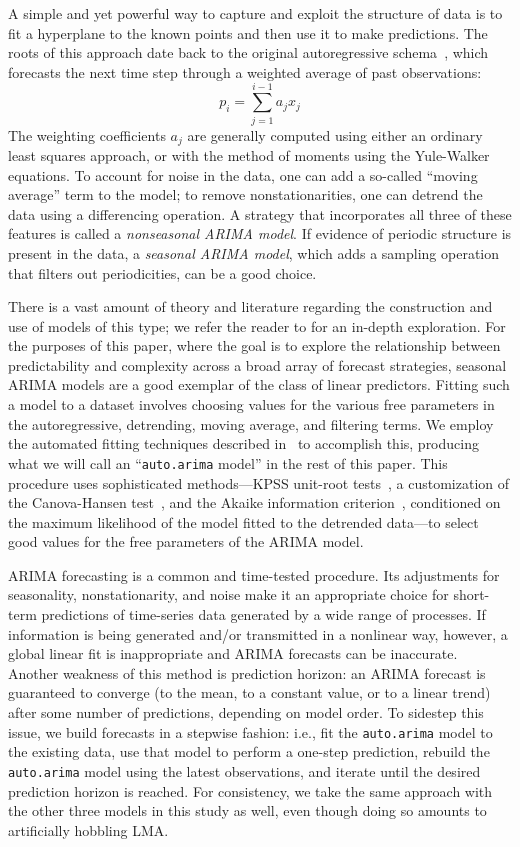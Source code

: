 \documentclass[%
pre,
reprint,
superscriptaddress,
showpacs,
nofootinbib,
nobibnotes,
 amsmath,amssymb,
 aps,
]{revtex4-1}
\newcommand{\arima}{{\tt auto.arima}\xspace}
\begin{document}
A simple and yet powerful way to capture and exploit the structure of
data is to fit a hyperplane to the known points and then use it to
make predictions.  The roots of this approach date back to the
original autoregressive schema~\cite{weigend93}, which forecasts the
next time step through a weighted average of past observations: $$p_i
= \sum_{j=1}^{i-1} a_j x_j$$ The weighting coefficients $a_j$ are
generally computed using either an ordinary least squares approach, or
with the method of moments using the Yule-Walker equations.  To
account for noise in the data, one can add a so-called ``moving
average'' term to the model; to remove nonstationarities, one can
detrend the data using a differencing operation.  A strategy that
incorporates all three of these features is called a \emph{nonseasonal
  ARIMA model}.  If evidence of periodic structure is present in the
data, a \emph{seasonal ARIMA model}, which adds a sampling operation
that filters out periodicities, can be a good choice.

There is a vast amount of theory and literature regarding the
construction and use of models of this type; we refer the reader to
\cite{davislinearts} for an in-depth exploration.  For the purposes of
this paper, where the goal is to explore the relationship between
predictability and complexity across a broad array of forecast
strategies, seasonal ARIMA models are a good exemplar of the class of
linear predictors.  Fitting such a model to a dataset involves
choosing values for the various free parameters in the autoregressive,
detrending, moving average, and filtering terms.  We employ the
automated fitting techniques described in~\cite{autoARIMA} to
accomplish this, producing what we will call an ``\arima model'' in
the rest of this paper.  This procedure uses sophisticated
methods---KPSS unit-root tests~\cite{KPSSunit}, a customization of the
Canova-Hansen test~\cite{Canova1995}, and the Akaike information
criterion~\cite{akaike1974}, conditioned on the maximum likelihood of
the model fitted to the detrended data---to select good values for the
free parameters of the ARIMA model.

ARIMA forecasting is a common and time-tested procedure.  Its
adjustments for seasonality, nonstationarity, and noise make it an
appropriate choice for short-term predictions of time-series data
generated by a wide range of processes.  If information is being
generated and/or transmitted in a nonlinear way, however, a global
linear fit is inappropriate and ARIMA forecasts can be inaccurate.
Another weakness of this method is prediction horizon: an ARIMA
forecast is guaranteed to converge (to the mean, to a constant value,
or to a linear trend) after some number of predictions, depending on
model order.  To sidestep this issue, we build forecasts in a stepwise
fashion: i.e., fit the \arima model to the existing data, use that
model to perform a one-step prediction, rebuild the \arima model using
the latest observations, and iterate until the desired prediction
horizon is reached.  For consistency, we take the same approach with
the other three models in this study as well, even though doing so
amounts to artificially hobbling LMA.
\end{document}
